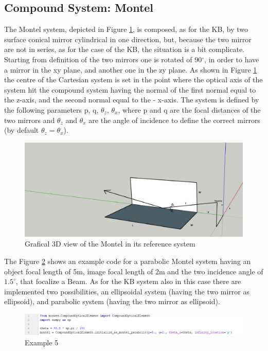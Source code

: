 \subsection{Compound System: Montel }
The Montel system, depicted in Figure \ref{fig: MontelSystem}, is composed, as for the KB, by two surface conical mirror cylindrical in one direction, but, because the two mirror are not in series, as for the case of the KB, the situation is a bit complicate. Starting from definition of the two mirrors one is rotated of 90$^\circ $, in order to have a mirror in the xy plane, and another one in the zy plane. As shown in Figure \ref{fig: MontelSystem} the centre of the Cartesian system is set in the point where the  optical axis of the system hit the compound system having the normal of the first normal equal to the z-axis, and the second normal equal to the - x-axis. The system is defined by the following parameters p, q, $\theta_z $, $\theta_x $, where p and q are the focal distances of the two mirrors and $\theta_z $ and $\theta_x $ are the angle of incidence to define the correct mirrors  (by default $\theta_z = \theta_x $).
\begin{figure}[H]
%
\centering
%
\includegraphics[width=1.\textwidth]{Immagini/Chapter3/MontelSystem2}
%
\caption{Grafical 3D view of the Montel in its reference system}
%
\label{fig: MontelSystem}
%
\end{figure}
The Figure \ref{fig: CodeMontel} shows an example code for a parabolic Montel system having an object focal length of 5m, image focal length of 2m and the two incidence angle of $1.5^{\circ} $, that focalize a Beam. As for the KB system also in this case there are implemented two possibilities, an ellipsoidal system (having the two mirror as ellipsoid), and parabolic system (having the two mirror as ellipsoid). 
\begin{figure}[H]
%
\centering
%
\includegraphics[width=1.\textwidth]{Immagini/Chapter3/CodeMontel}
%
\caption{Example 5}
%
\label{fig: CodeMontel}
%
\end{figure}
%
